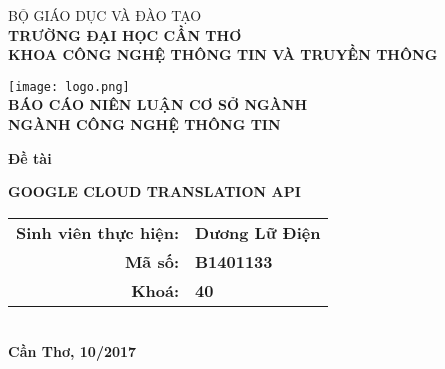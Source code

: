 \documentclass[../thesis.tex]{subfiles}
\begin{document}
\begin{titlepage}

\begin{center}

BỘ GIÁO DỤC VÀ ĐÀO TẠO\\
\textbf{TRƯỜNG ĐẠI HỌC CẦN THƠ\\}
\textbf{KHOA CÔNG NGHỆ THÔNG TIN VÀ TRUYỀN THÔNG\\[1cm]}

\texttt{[image: logo.png]}\\[1cm]

\textbf{BÁO CÁO NIÊN LUẬN CƠ SỞ NGÀNH\\}
\textbf{NGÀNH CÔNG NGHỆ THÔNG TIN\\[2cm]}

\begin{large}
\textbf{Đề tài\\[0.5cm]}
\end{large}
\textbf{{\LARGE GOOGLE CLOUD TRANSLATION API}}
\\[4cm]

\begin{tabular}{ r l }
\textbf{Sinh viên thực hiện:} & \textbf{Dương Lữ Điện}\\ 
\textbf{Mã số:} & \textbf{B1401133}\\  
\textbf{Khoá:} & \textbf{40}   
\end{tabular}
\\[4cm]

\textbf{Cần Thơ, 10/2017}

\end{center}

\end{titlepage}
\end{document}
